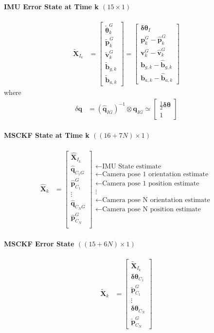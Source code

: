 \documentclass[10pt,letterpaper,fleqn,oneside]{article}
\newcommand{\nl}{\\[0.5em]}
\def\Vec#1{\mathbf{#1}} %
\newcommand{\bbm}{\begin{bmatrix}}
\newcommand{\ebm}{\end{bmatrix}}
\begin{document}
\paragraph{IMU Error State at Time k $(15\times1)$}
\begin{align}
\widetilde{\Vec{X}}_{I_k} &= 	\bbm \widetilde{\boldsymbol{\theta}}^G_k \nl
										\widetilde{\Vec{p}}^G_k \nl
										\widetilde{\Vec{v}}^G_k \nl
										\widetilde{\Vec{b}}_{g,k} \nl
										\widetilde{\Vec{b}}_{a,k}
								\ebm
								=
								\bbm
										\boldsymbol{\delta\theta}_I \nl
										\Vec{p}^G_k - \hat{\Vec{p}}^G_k \nl
										\Vec{v}^G_k - \hat{\Vec{v}}^G_k \nl
										\Vec{b}_{g,k} - \hat{\Vec{b}}_{g,k} \nl
										\Vec{b}_{a,k} - \hat{\Vec{b}}_{a,k} 
								\ebm
\end{align}
where
\begin{align}
\delta\Vec{q} &= \left(\hat{\Vec{q}}_{I G}\right)^{-1} \otimes \Vec{q}_{I G} \simeq \bbm \frac{1}{2}\boldsymbol{\delta\theta} \nl 1 \ebm
\end{align}

\paragraph{MSCKF State at Time k $((16+7N)\times1)$}
\begin{align}
\hat{\Vec{X}}_k &= \bbm	\hat{\Vec{X}}_{I_k} \nl
										\hat{\Vec{q}}_{C_1 G} \nl
										\hat{\Vec{p}}^G_{C_1} \nl
										\vdots \nl
										\hat{\Vec{q}}_{C_N G} \nl
										\hat{\Vec{p}}^G_{C_N} \nl										
								\ebm
								\begin{array}{l}
								\leftarrow \text{IMU State estimate} \nl
								\leftarrow \text{Camera pose 1 orientation estimate} \nl
								\leftarrow \text{Camera pose 1 position estimate} \nl
								\vdots \nl
								\leftarrow \text{Camera pose N orientation estimate} \nl
								\leftarrow \text{Camera pose N position estimate} \nl
								\end{array}		
\end{align}

\paragraph{MSCKF Error State $((15 + 6N) \times 1)$}
\begin{align}
\widetilde{\Vec{X}}_k &= \bbm	\widetilde{\Vec{X}}_{I_k} \nl
											\boldsymbol{\delta\theta}_{C_1} \nl
											\widetilde{\Vec{p}}^G_{C_1} \nl
											\vdots \nl
											\boldsymbol{\delta\theta}_{C_N} \nl
											\widetilde{\Vec{p}}^G_{C_N}
								\ebm
\end{align}
\end{document}
